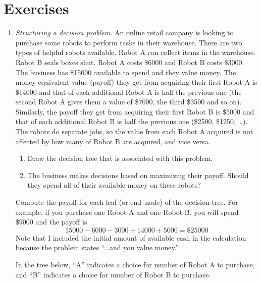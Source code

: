 \section{Exercises}
\begin{enumerate}

\item \emph{Structuring a decision problem.} 
An online retail company is looking to purchase some robots to
perform tasks in their warehouse. There are two types of 
helpful robots available. Robot A can collect
items in the warehouse. Robot B seals boxes shut. Robot A costs \$\num{6000}
and Robot B costs \$\num{3000}.
The business has \$\num{15000} available to spend and they value money. 
The money-equivalent
value (payoff) they get from acquiring their first Robot A is 
\$\num{14000} and
that of each additional Robot A is half the previous one (the second
Robot A gives them a value of \$\num{7000}, the third \$\num{3500} and so on).
Similarly, the payoff they get from acquiring their first Robot B is
\$\num{5000} and that of each additional Robot B is half the previous one
(\$\num{2500}, \$\num{1250}, \ldots). The robots do separate jobs, so 
the value from each Robot A acquired is not
affected by how many of Robot B are acquired, and vice versa.

\begin{enumerate}
\item Draw the decision tree that is associated with this problem. 
\item The business makes decisions based on maximizing their 
payoff. Should they spend all of their available money on 
these robots?
\end{enumerate}

Compute the payoff for each leaf (or end--node) of the
decision tree. For example, if you purchase one Robot A and one
Robot B, you will spend \$\num{9000} and the payoff is
  \[ \num{15000}-\num{6000}-\num{3000} + \num{14000}+\num{5000} = \$\num{25000} \]
  Note that I included the initial amount of available
  cash in the calculation because the problem states 
  ``\ldots and you value money.''

\begin{solution}
\bs
In the tree below, ``A'' indicates a choice for number of 
Robot A to purchase, and ``B'' indicates a choice for number 
of Robot B to purchase.


\end{solution}
\end{enumerate}
